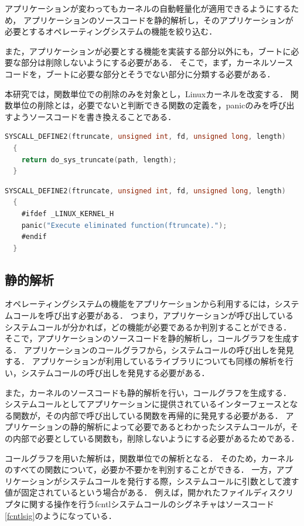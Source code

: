 \documentclass[graduation-thesis]{mlarticle}
\begin{document}
アプリケーションが変わってもカーネルの自動軽量化が適用できるようにするため，
アプリケーションのソースコードを静的解析し，そのアプリケーションが必要とするオペレーティングシステムの機能を絞り込む．

また，アプリケーションが必要とする機能を実装する部分以外にも，ブートに必要な部分は削除しないようにする必要がある．
そこで，まず，カーネルソースコードを，ブートに必要な部分とそうでない部分に分類する必要がある．

本研究では，関数単位での削除のみを対象とし，Linuxカーネルを改変する．
関数単位の削除とは，必要でないと判断できる関数の定義を，panicのみを呼び出すようソースコードを書き換えることである．

\begin{lstlisting}[language=C, caption=ftruncate関数(改変前), label=code:before]
  SYSCALL_DEFINE2(ftruncate, unsigned int, fd, unsigned long, length)
  {
    return do_sys_truncate(path, length);
  }
\end{lstlisting}
\begin{lstlisting}[language=C, caption=ftruncate関数(改変後), label=code:after]
  SYSCALL_DEFINE2(ftruncate, unsigned int, fd, unsigned long, length)
  {
    #ifdef _LINUX_KERNEL_H
    panic("Execute eliminated function(ftruncate).");
    #endif
  }
\end{lstlisting}

\subsection{静的解析}
\label{proposal:static}
オペレーティングシステムの機能をアプリケーションから利用するには，システムコールを呼び出す必要がある．
つまり，アプリケーションが呼び出しているシステムコールが分かれば，どの機能が必要であるか判別することができる．
そこで，アプリケーションのソースコードを静的解析し，コールグラフを生成する．
アプリケーションのコールグラフから，システムコールの呼び出しを発見する．
アプリケーションが利用しているライブラリについても同様の解析を行い，システムコールの呼び出しを発見する必要がある．

また，カーネルのソースコードも静的解析を行い，コールグラフを生成する．
システムコールとしてアプリケーションに提供されているインターフェースとなる関数が，その内部で呼び出している関数を再帰的に発見する必要がある．
アプリケーションの静的解析によって必要であるとわかったシステムコールが，その内部で必要としている関数も，削除しないようにする必要があるためである．

コールグラフを用いた解析は，関数単位での解析となる．
そのため，カーネルのすべての関数について，必要か不要かを判別することができる．
一方，アプリケーションがシステムコールを発行する際，システムコールに引数として渡す値が固定されているという場合がある．
例えば，開かれたファイルディスクリプタに関する操作を行うfcntlシステムコールのシグネチャはソースコード\ref{fcntlsig}のようになっている．
\end{document}
